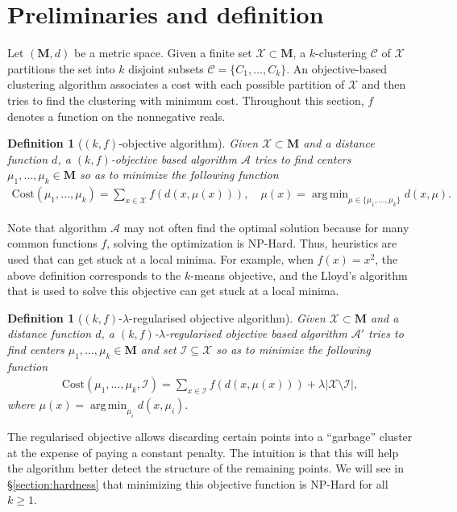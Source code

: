 \documentclass[12pt]{article}
\newcommand{\mc}{\mathcal}
\newcommand{\mb}{\mathbf}
\DeclareMathOperator*{\argmin}{arg\,min}
\newtheorem{definition}[theorem]{Definition}
\begin{document}
\section{Preliminaries and definition}
\label{sec:pre}

Let $(\mb M, d)$ be a metric space. Given a finite set $\mc X \subset \mb M$, a $k$-clustering $\mc C$ of $\mc X$ partitions the set into $k$ disjoint subsets $\mc C = \{C_1, \ldots, C_k\}$. An objective-based clustering algorithm associates a cost with each possible partition of $\mc X$ and then tries to find the clustering with minimum cost. Throughout this section, $f$ denotes a function on the nonnegative reals.

\begin{definition}[$(k, f)$-objective algorithm] Given $\mc X\subset \mb M$ and a distance function $d$, a $(k, f)$-objective based algorithm $\mc A$ tries to find centers $\mu_1, \ldots, \mu_k \in \mb M$ so as to minimize the following function
\begin{align}
\label{eqn:kfObjectiveAlg}
\text{Cost}(\mu_1, \ldots, \mu_k) = \sum_{x\in \mc X} f(d(x, \mu(x))), \quad \mu(x) = \argmin_{\mu \in \{\mu_1, \ldots, \mu_k\}} d(x, \mu).
\end{align}
\end{definition}
Note that algorithm $\mc A$ may not often find the optimal solution because for many common functions $f$, solving the optimization is NP-Hard. Thus, heuristics are used that can get stuck at a local minima. For example, when $f(x) = x^2$, the above definition corresponds to the $k$-means objective, and the Lloyd's algorithm that is used to solve this objective can get stuck at a local minima. 

\begin{definition}[$(k, f)$-$\lambda$-regularised objective algorithm] Given $\mc X\subset \mb M$ and a distance function $d$, a $(k, f)$-$\lambda$-regularised objective based algorithm $\mc A'$ tries to find centers $\mu_1, \ldots, \mu_k \in \mb M$ and set $\mc I\subseteq \mc X$ so as to minimize the following function
\begin{align}
\label{eqn:kfObjectiveAlg}
\text{Cost}(\mu_1, \ldots, \mu_k, \mc I) = \sum_{x\in \mc I} f(d(x, \mu(x))) + \lambda |\mc X \setminus \mc I|,
\end{align}
where $\mu(x) = \argmin_{\mu_i} d(x, \mu_i).$
\end{definition}

The regularised objective allows discarding certain points into a ``garbage'' cluster at the expense of paying a constant penalty. The intuition is that this will help the algorithm better detect the structure of the remaining points. We will see in \S \ref{section:hardness} that minimizing this objective function is NP-Hard for all $k \ge 1$.
\end{document}
